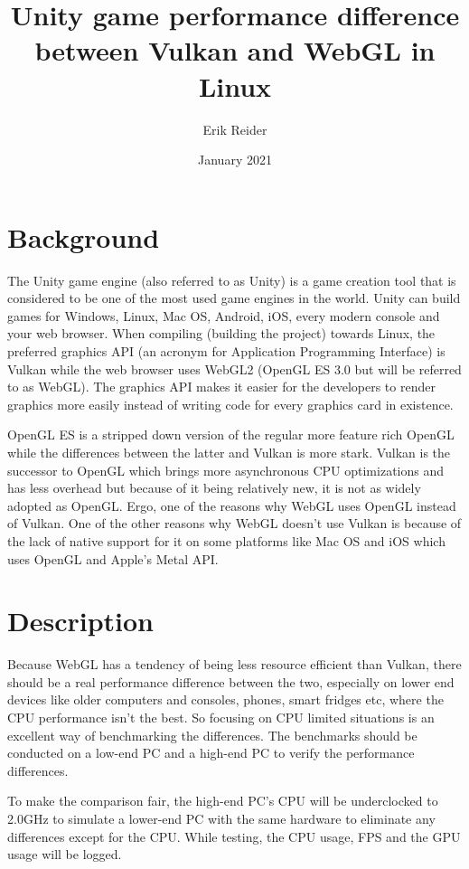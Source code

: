 \documentclass{article}
\title{Unity game performance difference between Vulkan and WebGL in Linux}
\author{Erik Reider}
\date{January 2021}
\begin{document}
\maketitle

\section{Background}
The Unity game engine (also referred to as Unity) is a game creation tool that is considered to be one of the most used game engines in the world. Unity can build games for Windows, Linux, Mac OS, Android, iOS, every modern console and your web browser. When compiling (building the project) towards Linux, the preferred graphics API (an acronym for Application Programming Interface) is Vulkan while the web browser uses WebGL2 (OpenGL ES 3.0 but will be referred to as WebGL). The graphics API makes it easier for the developers to render graphics more easily instead of writing code for every graphics card in existence. \par
OpenGL ES is a stripped down version of the regular more feature rich OpenGL while the differences between the latter and Vulkan is more stark. Vulkan is the successor to OpenGL which brings more asynchronous CPU optimizations and has less overhead but because of it being relatively new, it is not as widely adopted as OpenGL. Ergo, one of the reasons why WebGL uses OpenGL instead of Vulkan. One of the other reasons why WebGL doesn’t use Vulkan is because of the lack of native support for it on some platforms like Mac OS and iOS which uses OpenGL and Apple’s Metal API.


\section{Description}
Because WebGL has a tendency of being less resource efficient than Vulkan, there should be a real performance difference between the two, especially on lower end devices like older computers and consoles, phones, smart fridges etc, where the CPU performance isn’t the best. So focusing on CPU limited situations is an excellent way of benchmarking the differences. The benchmarks should be conducted on a low-end PC and a high-end PC to verify the performance differences. \par
To make the comparison fair, the high-end PC’s CPU will be underclocked to 2.0GHz to simulate a lower-end PC with the same hardware to eliminate any differences except for the CPU. While testing, the CPU usage, FPS and the GPU usage will be logged.
\end{document}
